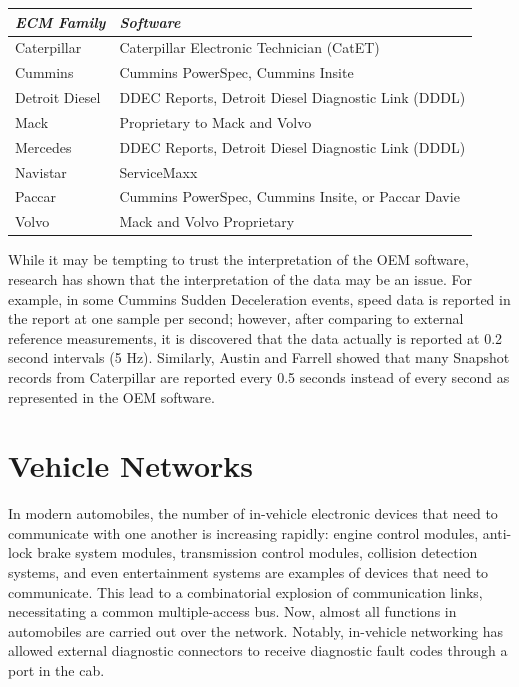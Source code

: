 \begin{tabular}{|l|l|}
\hline
\emph{ECM Family} & \emph{Software}\\
\hline
Caterpillar & Caterpillar Electronic Technician (CatET)\\
\hline
Cummins & Cummins PowerSpec, Cummins Insite\\
\hline
Detroit Diesel & DDEC Reports, Detroit Diesel Diagnostic Link (DDDL)\\
\hline
Mack & Proprietary to Mack and Volvo\\
\hline
Mercedes & DDEC Reports, Detroit Diesel Diagnostic Link (DDDL)\\
\hline
Navistar & ServiceMaxx \\
\hline
Paccar & Cummins PowerSpec, Cummins Insite, or Paccar Davie\\
\hline
Volvo & Mack and Volvo Proprietary\\
\hline

\end{tabular}

While it may be tempting to trust the interpretation of the OEM software, research has shown 
that the interpretation of the data may be an issue. For example, in some Cummins Sudden Deceleration 
events, speed data is reported in the report at one sample per second; however, after comparing to 
external reference measurements, it is discovered that the data actually is reported at 0.2 second 
intervals (5 Hz)\cite{bortolin2009}. Similarly, Austin and Farrell \cite{austin2011} showed that many Snapshot records 
from Caterpillar are reported every 0.5 seconds instead of every second as represented in the OEM software.

\section{Vehicle Networks}

In modern automobiles, the number of in-vehicle electronic devices that need to communicate with one another is increasing rapidly:
engine control modules, anti-lock brake system modules, transmission control modules, collision detection systems, and even entertainment systems are examples of
devices that need to communicate. This lead to a combinatorial explosion of communication links, necessitating a common multiple-access
bus. Now, almost all functions in automobiles are carried out over the network. Notably, in-vehicle networking has allowed external diagnostic
connectors to receive diagnostic fault codes through a port in the cab.

